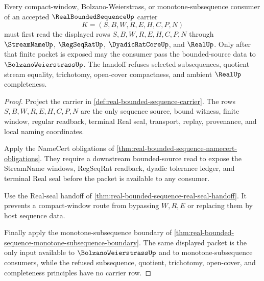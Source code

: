 \begin{theorem}
\label{thm:real-bounded-sequence-compact-window}
Every compact-window, Bolzano-Weierstrass, or monotone-subsequence consumer of an accepted $\RealBoundedSequenceUp$ carrier
$$
K=(S,B,W,R,E,H,C,P,N)
$$
must first read the displayed rows $S,B,W,R,E,H,C,P,N$ through $\StreamNameUp$, $\RegSeqRatUp$, $\DyadicRatCoreUp$, and $\RealUp$. Only after that finite packet is exposed may the consumer pass the bounded-source data to $\BolzanoWeierstrassUp$. The handoff refuses selected subsequences, quotient stream equality, trichotomy, open-cover compactness, and ambient $\RealUp$ completeness.
\end{theorem}
\begin{proof}
Project the carrier in \autoref{def:real-bounded-sequence-carrier}. The rows $S,B,W,R,E,H,C,P,N$ are the only sequence source, bound witness, finite window, regular readback, terminal Real seal, transport, replay, provenance, and local naming coordinates.

Apply the NameCert obligations of \autoref{thm:real-bounded-sequence-namecert-obligations}. They require a downstream bounded-source read to expose the StreamName windows, RegSeqRat readback, dyadic tolerance ledger, and terminal Real seal before the packet is available to any consumer.

Use the Real-seal handoff of \autoref{thm:real-bounded-sequence-real-seal-handoff}. It prevents a compact-window route from bypassing $W,R,E$ or replacing them by host sequence data.

Finally apply the monotone-subsequence boundary of \autoref{thm:real-bounded-sequence-monotone-subsequence-boundary}. The same displayed packet is the only input available to $\BolzanoWeierstrassUp$ and to monotone-subsequence consumers, while the refused subsequence, quotient, trichotomy, open-cover, and completeness principles have no carrier row.
\end{proof}


